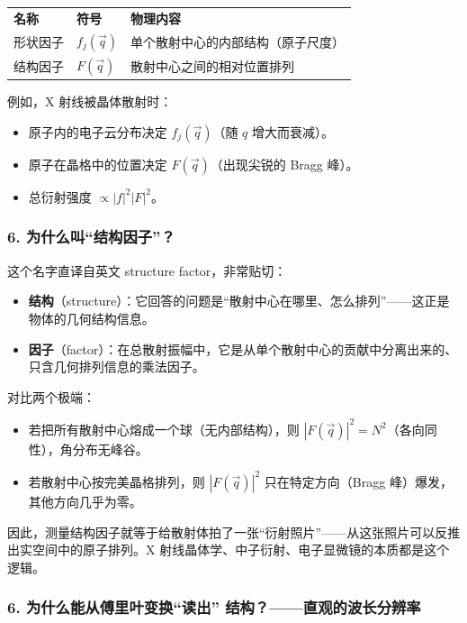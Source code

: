 \begin{derivationbox}
\begin{tabular}{lll}
\textbf{名称} & \textbf{符号} & \textbf{物理内容} \\
形状因子 & $f_j(\vec{q})$ & 单个散射中心的内部结构（原子尺度） \\
结构因子 & $F(\vec{q})$ & 散射中心之间的相对位置排列 \\
\end{tabular}

例如，X 射线被晶体散射时：
\begin{itemize}
    \item 原子内的电子云分布决定 $f_j(\vec{q})$（随 $q$ 增大而衰减）。
    \item 原子在晶格中的位置决定 $F(\vec{q})$（出现尖锐的 Bragg 峰）。
    \item 总衍射强度 $\propto |f|^2 |F|^2$。
\end{itemize}

\subsubsection*{6. 为什么叫``结构因子''？}

这个名字直译自英文 structure factor，非常贴切：
\begin{itemize}
    \item \textbf{结构}（structure）：它回答的问题是``散射中心在哪里、怎么排列''——这正是物体的几何结构信息。
    \item \textbf{因子}（factor）：在总散射振幅中，它是从单个散射中心的贡献中分离出来的、只含几何排列信息的乘法因子。
\end{itemize}

对比两个极端：
\begin{itemize}
    \item 若把所有散射中心熔成一个球（无内部结构），则 $|F(\vec{q})|^2 = N^2$（各向同性），角分布无峰谷。
    \item 若散射中心按完美晶格排列，则 $|F(\vec{q})|^2$ 只在特定方向（Bragg 峰）爆发，其他方向几乎为零。
\end{itemize}

因此，测量结构因子就等于给散射体拍了一张``衍射照片''——从这张照片可以反推出实空间中的原子排列。X 射线晶体学、中子衍射、电子显微镜的本质都是这个逻辑。

\subsubsection*{6. 为什么能从傅里叶变换``读出'' 结构？——直观的波长分辨率}


\end{derivationbox}
